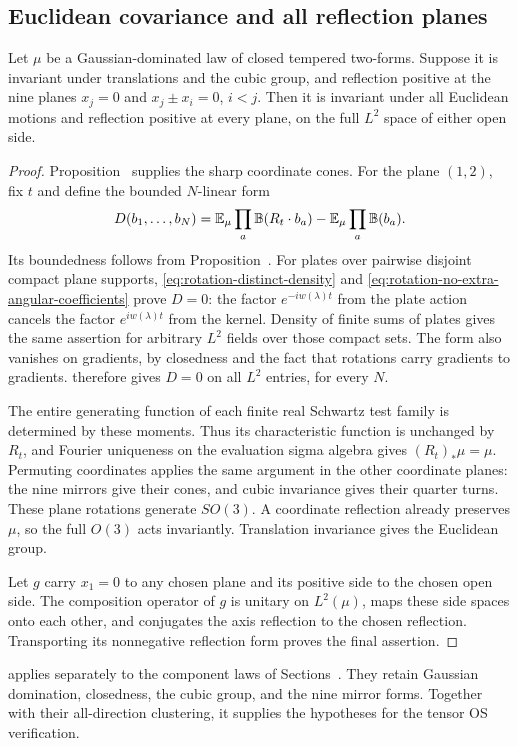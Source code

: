 \subsection{Euclidean covariance and all reflection planes}
\label{subsec:rotation-conclusion}

\begin{theorem}\label{thm:rotation-covariance}
Let $\mu$ be a Gaussian-dominated law of closed tempered two-forms.
Suppose it is invariant under translations and the cubic group,
and reflection positive at the nine planes
$x_j=0$ and $x_j\pm x_i=0$, $i<j$.
Then it is invariant under all Euclidean motions and reflection
positive at every plane, on the full $L^2$ space of either open side.
\end{theorem}

\begin{proof}
Proposition~ supplies the sharp coordinate
cones. For the plane $(1,2)$, fix $t$ and define the bounded
$N$-linear form
\[
 D(b_1,\ldots,b_N)=
 \mathbb E_\mu\prod_a\mathbb B(R_t\cdot b_a)
       -\mathbb E_\mu\prod_a\mathbb B(b_a).
\]
Its boundedness follows from Proposition~.
For plates over pairwise disjoint compact plane supports,
\eqref{eq:rotation-distinct-density} and
\eqref{eq:rotation-no-extra-angular-coefficients} prove $D=0$:
the factor $e^{-iw(\lambda)t}$ from the plate action cancels
the factor $e^{iw(\lambda)t}$ from the kernel.
Density of finite sums of plates gives the same assertion for
arbitrary $L^2$ fields over those compact sets.
The form also vanishes on gradients, by closedness and the
fact that rotations carry gradients to gradients.
 therefore gives $D=0$
on all $L^2$ entries, for every $N$.

The entire generating function of each finite real Schwartz
test family is determined by these moments. Thus its
characteristic function is unchanged by $R_t$, and Fourier
uniqueness on the evaluation sigma algebra gives
$(R_t)_*\mu=\mu$.
Permuting coordinates applies the same argument in the other
coordinate planes: the nine mirrors give their cones, and
cubic invariance gives their quarter turns.
These plane rotations generate $SO(3)$.
A coordinate reflection already preserves $\mu$, so the full
$O(3)$ acts invariantly. Translation invariance gives the
Euclidean group.

Let $g$ carry $x_1=0$ to any chosen plane and its positive side
to the chosen open side. The composition operator of $g$ is
unitary on $L^2(\mu)$, maps these side spaces onto each other,
and conjugates the axis reflection to the chosen reflection.
Transporting its nonnegative reflection form proves the final
assertion.
\end{proof}

 applies separately to the
component laws of Sections~.
They retain Gaussian domination, closedness, the cubic group,
and the nine mirror forms. Together with their all-direction
clustering, it supplies the hypotheses for the tensor OS
verification.



